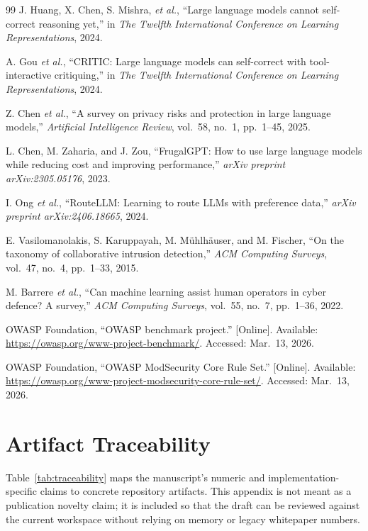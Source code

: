 \documentclass[pdflatex,sn-mathphys-num]{sn-jnl}
\begin{document}
\begin{thebibliography}{99}
J. Huang, X. Chen, S. Mishra, \emph{et al.}, ``Large language models cannot self-correct reasoning yet,'' in \emph{The Twelfth International Conference on Learning Representations}, 2024.

A. Gou \emph{et al.}, ``CRITIC: Large language models can self-correct with tool-interactive critiquing,'' in \emph{The Twelfth International Conference on Learning Representations}, 2024.

Z. Chen \emph{et al.}, ``A survey on privacy risks and protection in large language models,'' \emph{Artificial Intelligence Review}, vol.~58, no.~1, pp.~1--45, 2025.

L. Chen, M. Zaharia, and J. Zou, ``FrugalGPT: How to use large language models while reducing cost and improving performance,'' \emph{arXiv preprint arXiv:2305.05176}, 2023.

I. Ong \emph{et al.}, ``RouteLLM: Learning to route LLMs with preference data,'' \emph{arXiv preprint arXiv:2406.18665}, 2024.

E. Vasilomanolakis, S. Karuppayah, M. M{\"u}hlh{\"a}user, and M. Fischer, ``On the taxonomy of collaborative intrusion detection,'' \emph{ACM Computing Surveys}, vol.~47, no.~4, pp.~1--33, 2015.

M. Barrere \emph{et al.}, ``Can machine learning assist human operators in cyber defence? A survey,'' \emph{ACM Computing Surveys}, vol.~55, no.~7, pp.~1--36, 2022.

OWASP Foundation, ``OWASP benchmark project.'' [Online]. Available: \url{https://owasp.org/www-project-benchmark/}. Accessed: Mar.~13, 2026.

OWASP Foundation, ``OWASP ModSecurity Core Rule Set.'' [Online]. Available: \url{https://owasp.org/www-project-modsecurity-core-rule-set/}. Accessed: Mar.~13, 2026.

\end{thebibliography}

\appendix
\section{Artifact Traceability}

Table~\ref{tab:traceability} maps the manuscript's numeric and implementation-specific claims to concrete repository artifacts. This appendix is not meant as a publication novelty claim; it is included so that the draft can be reviewed against the current workspace without relying on memory or legacy whitepaper numbers.
\end{document}
